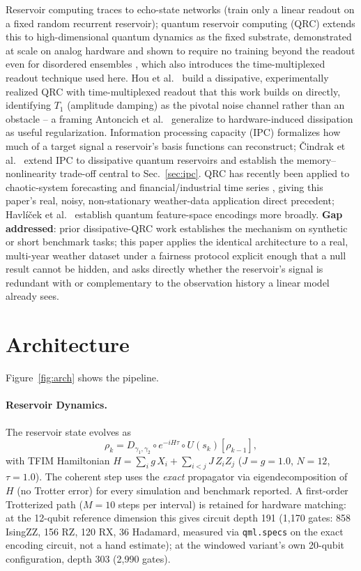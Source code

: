 \documentclass[11pt]{article}
\begin{document}
Reservoir computing traces to echo-state networks \cite{jaeger2001} (train only a linear readout
on a fixed random recurrent reservoir); quantum reservoir computing (QRC) extends this to
high-dimensional quantum dynamics as the fixed substrate, demonstrated at scale on analog hardware
\cite{kornjaca2024} and shown to require no training beyond the readout even for disordered
ensembles \cite{fujii2017}, which also introduces the time-multiplexed readout technique used
here. Hou et al.\ \cite{hou} build a dissipative, experimentally realized QRC with time-multiplexed
readout that this work builds on directly, identifying $T_1$ (amplitude damping) as the pivotal
noise channel rather than an obstacle -- a framing Antoncich et al.\ \cite{antoncich} generalize
to hardware-induced dissipation as useful regularization. Information processing capacity (IPC)
\cite{dambre2012} formalizes how much of a target signal a reservoir's basis functions can
reconstruct; \v{C}indrak et al.\ \cite{cindrak2026} extend IPC to dissipative quantum reservoirs
and establish the memory--nonlinearity trade-off central to Sec.~\ref{sec:ipc}. QRC has recently
been applied to chaotic-system forecasting \cite{ahmed2025} and financial/industrial time series
\cite{li2025,tandon2025}, giving this paper's real, noisy, non-stationary weather-data application
direct precedent; Havl\'{i}\v{c}ek et al.\ \cite{havlicek2019} establish quantum feature-space
encodings more broadly. \textbf{Gap addressed}: prior dissipative-QRC work establishes the
mechanism on synthetic or short benchmark tasks; this paper applies the identical architecture to
a real, multi-year weather dataset under a fairness protocol explicit enough that a null result
cannot be hidden, and asks directly whether the reservoir's signal is redundant with or
complementary to the observation history a linear model already sees.

\section{Architecture}
\label{sec:arch}

Figure~\ref{fig:arch} shows the pipeline.

\paragraph{Reservoir Dynamics.}

The reservoir state evolves as
\begin{equation}
\rho_k = D_{\gamma_1,\gamma_2} \circ e^{-iH\tau} \circ U(s_k)[\rho_{k-1}],
\end{equation}
with TFIM Hamiltonian $H = \sum_i g\,X_i + \sum_{i<j} J\,Z_iZ_j$ ($J{=}g{=}1.0$, $N{=}12$,
$\tau{=}1.0$). The coherent step uses the \emph{exact} propagator via eigendecomposition of $H$
(no Trotter error) for every simulation and benchmark reported. A first-order Trotterized path
($M{=}10$ steps per interval) is retained for hardware matching: at the 12-qubit reference
dimension this gives circuit depth 191 (1{,}170 gates: 858 IsingZZ, 156 RZ, 120 RX, 36 Hadamard,
measured via \texttt{qml.specs} on the exact encoding circuit, not a hand estimate); at the
windowed variant's own 20-qubit configuration, depth 303 (2{,}990 gates).
\end{document}
